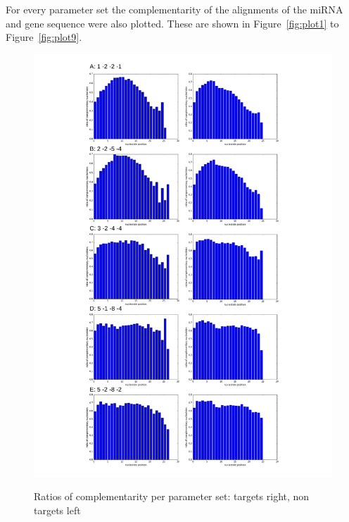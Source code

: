 \documentclass[12pt]{article}
\begin{document}
For every parameter set the complementarity of the alignments of the miRNA and gene sequence were also plotted. These are shown in Figure~\ref{fig:plot1} to Figure~\ref{fig:plot9}.

\begin{figure}
\includegraphics[scale=0.65]{results/combined_results.pdf}
\label{ratios}
\caption{Ratios of complementarity per parameter set: targets right, non targets left}
\end{figure}
\end{document}
